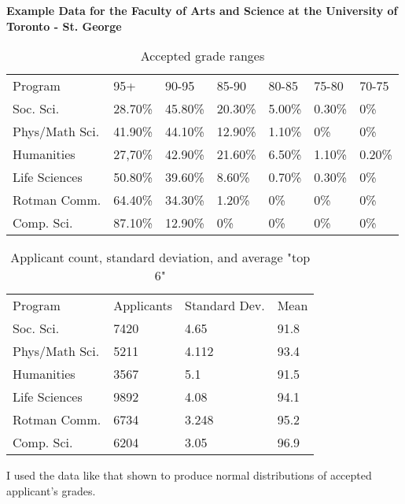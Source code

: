 \documentclass{article}
\begin{document}
    \textbf{Example Data for the Faculty of Arts and Science at the University of Toronto - St. George}


    \begin{table}[]
        \begin{center}
            \caption{Accepted grade ranges}
        \end{center}
        \begin{tabular}{lllllll}
            Program        & 95+     & 90-95   & 85-90   & 80-85  & 75-80  & 70-75  \\
            Soc. Sci.      & 28.70\% & 45.80\% & 20.30\% & 5.00\% & 0.30\% & 0\%    \\
            Phys/Math Sci. & 41.90\% & 44.10\% & 12.90\% & 1.10\% & 0\%    & 0\%    \\
            Humanities     & 27,70\% & 42.90\% & 21.60\% & 6.50\% & 1.10\% & 0.20\% \\
            Life Sciences  & 50.80\% & 39.60\% & 8.60\%  & 0.70\% & 0.30\% & 0\%    \\
            Rotman Comm.   & 64.40\% & 34.30\% & 1.20\%  & 0\%    & 0\%    & 0\%    \\
            Comp. Sci.     & 87.10\% & 12.90\% & 0\%     & 0\%    & 0\%    & 0\%
        \end{tabular}
    \end{table}

    \begin{table}[]
        \begin{center}
            \caption{Applicant count, standard deviation, and average "top 6"}
        \end{center}
        \begin{tabular}{llll}
            Program        & Applicants & Standard Dev. & Mean \\
            Soc. Sci.      & 7420       & 4.65          & 91.8 \\
            Phys/Math Sci. & 5211       & 4.112         & 93.4 \\
            Humanities     & 3567       & 5.1           & 91.5 \\
            Life Sciences  & 9892       & 4.08          & 94.1 \\
            Rotman Comm.   & 6734       & 3.248         & 95.2 \\
            Comp. Sci.     & 6204       & 3.05          & 96.9
        \end{tabular}
    \end{table}
    I used the data like that shown to produce normal distributions of accepted applicant's grades.
\end{document}
